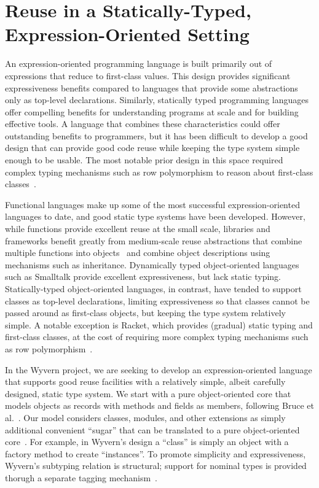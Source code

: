 \documentclass[preprint,10pt]{sigplanconf}
\begin{document}

%


\section{Reuse in a Statically-Typed, Expression-Oriented Setting}

An expression-oriented programming language is built primarily out of
expressions that reduce to first-class values.  This design provides
significant expressiveness benefits compared to languages that provide
some abstractions only as top-level declarations.  Similarly, statically
typed programming languages offer compelling benefits for understanding
programs at scale and for building effective tools.  A language that
combines these characteristics could offer outstanding benefits to
programmers, but it has been difficult to develop a good design that
can provide good code reuse while keeping
the type system simple enough to be usable.  The most notable prior
design in this space required complex typing mechanisms such as row
polymorphism to reason about first-class classes~\cite{TSDTF}.

Functional languages make up some of the most successful
expression-oriented languages to date, and good static type systems
have been developed.  However, while functions provide excellent reuse
at the small scale, libraries and frameworks benefit greatly from
medium-scale reuse abstractions that combine multiple functions into
objects~\cite{Aldrich:2013:PIW:2509578.2514738} and combine object
descriptions using mechanisms such as inheritance.  Dynamically typed
object-oriented languages such as Smalltalk provide excellent
expressiveness, but lack static typing.  Statically-typed
object-oriented languages, in contrast, have tended to support classes
as top-level declarations, limiting expressiveness so that classes
cannot be passed around as first-class objects, but keeping the type
system relatively simple.  A notable exception is Racket, which
provides (gradual) static typing and first-class classes, at the cost
of requiring more complex typing mechanisms such as row
polymorphism~\cite{TSDTF}.

In the Wyvern project, we are seeking to develop an expression-oriented
language that supports good reuse facilities with a relatively simple,
albeit carefully designed, static type system.  We start with a pure
object-oriented core that models objects as records with methods and
fields as members, following Bruce et al.~\cite{BCP99}. Our model
considers classes, modules, and other extensions as simply additional
convenient ``sugar'' that can be translated to a pure object-oriented
core~\cite{Nistor:2013:WST:2489828.2489830}.  For example, in Wyvern's
design a ``class'' is simply an object with a factory method to create
``instances''.  To promote simplicity and expressiveness, Wyvern's
subtyping relation is structural; support for nominal types is
provided thorugh a separate tagging
mechanism~\cite{DBLP:conf/ecoop/LeeASP15}.
\end{document}
